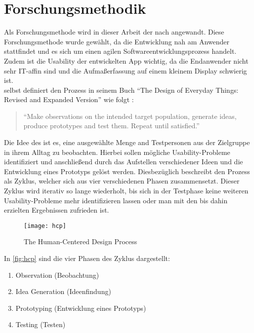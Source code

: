 \chapter{Forschungsmethodik}
Als Forschungsmethode wird in dieser Arbeit der \hcdp{} nach \citeauthor{Norman13} angewandt.
Diese Forschungsmethode wurde gewählt, da die Entwicklung nah am Anwender stattfindet und es sich um einen agilen Softwareentwicklungsprozess  handelt.
Zudem ist die Usability der entwickelten App wichtig, da die Endanwender nicht sehr IT-affin sind und die Aufmaßerfassung auf einem kleinem Display schwierig ist. \\

\citeauthor{Norman13} selbst definiert den Prozess in seinem Buch ``The Design of Everyday Things: Revised and Expanded Version'' wie folgt \citep[Abbildung 6.2]{Norman13}:

\begin{quote}
  ``Make observations on the intended target population, generate ideas, produce prototypes and test them.
  Repeat until satisfied.''
\end{quote}

\noindent
Die Idee des \hcdp{} ist es, eine ausgewählte Menge and Testpersonen aus der Zielgruppe in ihrem Alltag zu beobachten.
Hierbei sollen mögliche Usability-Probleme identifiziert und anschließend durch das Aufstellen verschiedener Ideen und die Entwicklung eines Prototyps gelöst werden.
Diesbezüglich beschreibt \citeauthor{Norman13} den Prozess als Zyklus, welcher sich aus vier verschiedenen Phasen zusammensetzt.
Dieser Zyklus wird iterativ so lange wiederholt, bis sich in der Testphase keine weiteren Usability-Probleme mehr identifizieren lassen oder man mit den bis dahin erzielten Ergebnissen zufrieden ist. \\

\begin{figure}[h]
  \centering
  \texttt{[image: hcp]}
  \caption{The Human-Centered Design Process}
  \label{fig:hcp}
\end{figure}

\noindent
In \autoref{fig:hcp} sind die vier Phasen des Zyklus dargestellt:
\begin{enumerate}
  \item Observation (Beobachtung) \label{itm:observation}
  \item Idea Generation (Ideenfindung) \label{itm:idea}
  \item Prototyping (Entwicklung eines Prototyps) \label{itm:prototyping}
  \item Testing (Testen) \label{itm:testing}
\end{enumerate}

